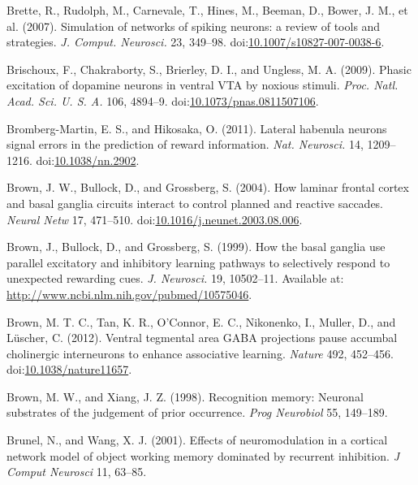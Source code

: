 \documentclass[
  11pt,
  a4paper,
]{scrbook}
\newlength{\cslhangindent}
\newenvironment{CSLReferences}[2] %
 {\begin{list}{}{%
  \setlength{\itemindent}{0pt}
  \setlength{\leftmargin}{0pt}
  \setlength{\parsep}{0pt}
  \ifodd #1
   \setlength{\leftmargin}{\cslhangindent}
   \setlength{\itemindent}{-1\cslhangindent}
  \fi
  \setlength{\itemsep}{#2\baselineskip}}}
 {\end{list}}
\begin{document}
\begin{CSLReferences}{1}{1}
Brette, R., Rudolph, M., Carnevale, T., Hines, M., Beeman, D., Bower, J.
M., et al. (2007). {Simulation of networks of spiking neurons: a review
of tools and strategies.} \emph{J. Comput. Neurosci.} 23, 349--98.
doi:\href{https://doi.org/10.1007/s10827-007-0038-6}{10.1007/s10827-007-0038-6}.

Brischoux, F., Chakraborty, S., Brierley, D. I., and Ungless, M. A.
(2009). {Phasic excitation of dopamine neurons in ventral VTA by noxious
stimuli.} \emph{Proc. Natl. Acad. Sci. U. S. A.} 106, 4894--9.
doi:\href{https://doi.org/10.1073/pnas.0811507106}{10.1073/pnas.0811507106}.

Bromberg-Martin, E. S., and Hikosaka, O. (2011). {Lateral habenula
neurons signal errors in the prediction of reward information.}
\emph{Nat. Neurosci.} 14, 1209--1216.
doi:\href{https://doi.org/10.1038/nn.2902}{10.1038/nn.2902}.

Brown, J. W., Bullock, D., and Grossberg, S. (2004). How laminar frontal
cortex and basal ganglia circuits interact to control planned and
reactive saccades. \emph{Neural Netw} 17, 471--510.
doi:\href{https://doi.org/10.1016/j.neunet.2003.08.006}{10.1016/j.neunet.2003.08.006}.

Brown, J., Bullock, D., and Grossberg, S. (1999). {How the basal ganglia
use parallel excitatory and inhibitory learning pathways to selectively
respond to unexpected rewarding cues.} \emph{J. Neurosci.} 19,
10502--11. Available at:
\url{http://www.ncbi.nlm.nih.gov/pubmed/10575046}.

Brown, M. T. C., Tan, K. R., O'Connor, E. C., Nikonenko, I., Muller, D.,
and Lüscher, C. (2012). Ventral tegmental area GABA projections pause
accumbal cholinergic interneurons to enhance associative learning.
\emph{Nature} 492, 452--456.
doi:\href{https://doi.org/10.1038/nature11657}{10.1038/nature11657}.

Brown, M. W., and Xiang, J. Z. (1998). Recognition memory: Neuronal
substrates of the judgement of prior occurrence. \emph{Prog Neurobiol}
55, 149--189.

Brunel, N., and Wang, X. J. (2001). Effects of neuromodulation in a
cortical network model of object working memory dominated by recurrent
inhibition. \emph{J Comput Neurosci} 11, 63--85.


\end{CSLReferences}
\end{document}
